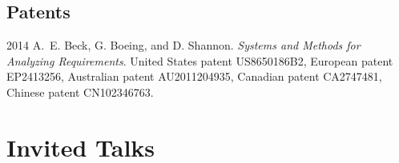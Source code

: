 \documentclass[11pt,letterpaper]{report} %
\begin{document}
    \subsection*{Patents}

    \begin{tablist}

        \item[2014] \tab{}A.~E. Beck, G. Boeing, and D. Shannon. \textit{Systems and Methods for Analyzing Requirements}. United States patent US8650186B2, European patent EP2413256, Australian patent AU2011204935, Canadian patent CA2747481, Chinese patent CN102346763.

    \end{tablist}



    \section*{Invited Talks}
\end{document}
